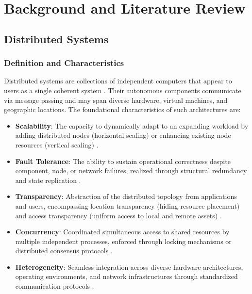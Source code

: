 \chapter{Background and Literature Review}
\label{ch:background}

\section{Distributed Systems}
\label{sec:bg_distributed_systems}

\subsection{Definition and Characteristics}
\label{subsec:bg_ds_definition}

Distributed systems are collections of independent computers that appear to users as a
single coherent system \cite{tanenbaum2007distributed}. Their autonomous components
communicate via message passing and may span diverse hardware, virtual machines, and
geographic locations. The foundational characteristics of such architectures are:

\begin{itemize}
    \item \textbf{Scalability}: The capacity to dynamically adapt to an expanding
    workload by adding distributed nodes (horizontal scaling) or enhancing existing
    node resources (vertical scaling) \cite{gorton2022foundations, kleppmann2017designing}.

    \item \textbf{Fault Tolerance}: The ability to sustain operational correctness
    despite component, node, or network failures, realized through structural redundancy
    and state replication \cite{kleppmann2017designing, tanenbaum2007distributed}.

    \item \textbf{Transparency}: Abstraction of the distributed topology from
    applications and users, encompassing location transparency (hiding resource
    placement) and access transparency (uniform access to local and remote assets)
    \cite{tanenbaum2007distributed, coulouris2012distributed}.

    \item \textbf{Concurrency}: Coordinated simultaneous access to shared resources
    by multiple independent processes, enforced through locking mechanisms or
    distributed consensus protocols \cite{coulouris2012distributed, kleppmann2017designing}.

    \item \textbf{Heterogeneity}: Seamless integration across diverse hardware
    architectures, operating environments, and network infrastructures through
    standardized communication protocols \cite{coulouris2012distributed, tanenbaum2007distributed}.
\end{itemize}

